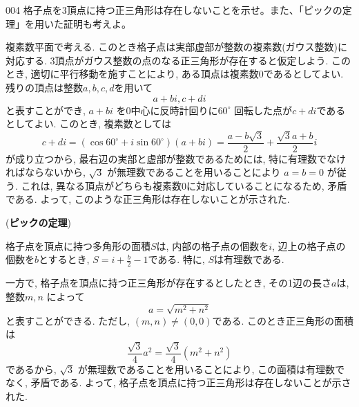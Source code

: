 \begin{prob}{004}{}{}
 格子点を3頂点に持つ正三角形は存在しないことを示せ。また、「ピックの定理」を用いた証明も考えよ。
\end{prob}

複素数平面で考える. このとき格子点は実部虚部が整数の複素数(ガウス整数)に対応する. 3頂点がガウス整数の点のなる正三角形が存在すると仮定しよう. このとき, 適切に平行移動を施すことにより, ある頂点は複素数$0$であるとしてよい. 残りの頂点は整数$a,b,c,d$を用いて
$$
a+bi, c+di
$$
と表すことができ, $a+bi$ を0中心に反時計回りに$60^\circ$ 回転した点が$c+di$であるとしてよい. このとき, 複素数としては
$$
c+di = (\cos{60^\circ} + i\sin{60^\circ})(a+bi) = \dfrac{a-b\sqrt{3}}{2} + \dfrac{\sqrt{3}a+b}{2}i
$$
が成り立つから, 最右辺の実部と虚部が整数であるためには, 特に有理数でなければならないから, $\sqrt{3}$ が無理数であることを用いることにより $a=b=0$ が従う. これは, 異なる頂点がどちらも複素数0に対応していることになるため, 矛盾である. よって, このような正三角形は存在しないことが示された.

(\textbf{ピックの定理})

格子点を頂点に持つ多角形の面積$S$は,
内部の格子点の個数を$i$, 辺上の格子点の個数を$b$とするとき,
$S = i + \frac{b}{2} - 1$である.
特に, $S$は有理数である.

一方で, 格子点を頂点に持つ正三角形が存在するとしたとき, その1辺の長さ$a$は, 整数$m,n$ によって
$$
a = \sqrt{m^2 + n^2}
$$
と表すことができる. ただし, $(m,n)\neq (0,0)$である. このとき正三角形の面積は
$$
\frac{\sqrt{3}}{4} a^2 = \dfrac{\sqrt{3}}{4}(m^2 + n^2)
$$
であるから, $\sqrt{3}$ が無理数であることを用いることにより,
この面積は有理数でなく, 矛盾である. よって, 格子点を頂点に持つ正三角形は存在しないことが示された.
